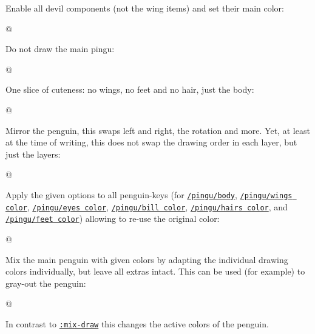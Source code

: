 \documentclass[parskip=half,english,numbers=noenddot,footnotes=nomultiple,oneside,fontsize=10pt,DIV=15,headinclude]{scrartcl}
\makeatletter
\def\pingu@listing@text{}
\def\lpingu#1{\begingroup\def\pingu@listing@text{#1}\lstinline[style=lstpingu,breakatwhitespace]'#1'\endgroup}
\newcommand*\keyref[2][/pingu/]{\hyperref[pk:#1#2]{\lpingu{#1#2}}}
\newcommand*\dkeyref[2][/pingu/]{\hyperref[pk:#1#2]{\lpingu{#2}}}
\makeatother
\begin{document}
	Enable all devil components (not the wing items) and set their main color:
\begin{tcblisting}{@}
\begin{tikzpicture}
	\pingu[:devil=green]
\end{tikzpicture}
\end{tcblisting}
\endkeyexplain


	Do not draw the main pingu:
\begin{tcblisting}{@}
\end{tcblisting}
\endkeyexplain

	One slice of cuteness: no wings, no feet and no hair, just the body:
\begin{tcblisting}{@}
\begin{tikzpicture}
	\pingu[:toast]
\end{tikzpicture}
\end{tcblisting}
\endkeyexplain

	Mirror the penguin, this swaps left and right, the rotation and more.
	Yet, at least at the time of writing, this does not swap the drawing order in each layer, but just the layers:
\begin{tcblisting}{@}
\begin{tikzpicture}
	\pingu[:back, left wing wave,
	       cane left, left item angle=70]
\end{tikzpicture}
\end{tcblisting}
\endkeyexplain

	Apply the given options to all penguin-keys (for \keyref{body}, \keyref{wings color}, \keyref{eyes color}, \keyref{bill color}, \keyref{hairs color}, and \keyref{feet color}) allowing to re-use the original color:
\begin{tcblisting}{@}
\begin{tikzpicture}
	\pingu[:pingu={/pingu/@block/.style={fill=green}}]
\end{tikzpicture}
\end{tcblisting}
\endkeyexplain

	Mix the main penguin with given colors by adapting the individual drawing colors individually, but leave all extras intact. This can be used (for example) to gray-out the penguin:
\begin{tcblisting}{@}
\begin{tikzpicture}
	\pingu[mask,tie=red,lollipop left,:mix=50!green]
\end{tikzpicture}
\end{tcblisting}
	In contrast to \dkeyref{:mix-draw} this changes the active colors of the penguin.
\endkeyexplain
\end{document}

